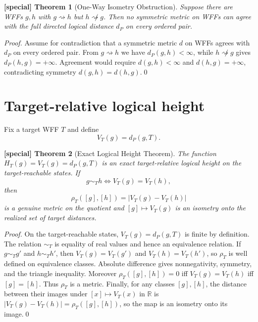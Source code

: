 \documentclass[11pt]{article}
\newtheorem{spthm}{[special] Theorem}
\newcommand{\dP}{d_P}
\begin{document}
\begin{spthm}[One-Way Isometry Obstruction]
Suppose there are WFFs $g,h$ with $g\rightsquigarrow h$ but $h\not\rightsquigarrow g$. Then no symmetric metric on WFFs can agree with the full directed logical distance $\dP$ on every ordered pair.
\end{spthm}
\textit{Proof.} Assume for contradiction that a symmetric metric $d$ on WFFs agrees with $d_P$ on every ordered pair. From $g\rightsquigarrow h$ we have $d_P(g,h)<\infty$, while $h\not\rightsquigarrow g$ gives $d_P(h,g)=+\infty$. Agreement would require $d(g,h)<\infty$ and $d(h,g)=+\infty$, contradicting symmetry $d(g,h)=d(h,g)$.\qed


\section{Target-relative logical height}
Fix a target WFF $T$ and define
\[V_T(g)=\dP(g,T).\]

\begin{spthm}[Exact Logical Height Theorem]
The function $H_T(g)=V_T(g)=\dP(g,T)$ is an exact target-relative logical height on the target-reachable states. If
\[g\sim_T h\iff V_T(g)=V_T(h),\]
then
\[\rho_T([g],[h])=|V_T(g)-V_T(h)|\]
is a genuine metric on the quotient and $[g]\mapsto V_T(g)$ is an isometry onto the realized set of target distances.
\end{spthm}
\textit{Proof.} On the target-reachable states, $V_T(g)=d_P(g,T)$ is finite by definition. The relation $\sim_T$ is equality of real values and hence an equivalence relation. If $g\sim_T g'$ and $h\sim_T h'$, then $V_T(g)=V_T(g')$ and $V_T(h)=V_T(h')$, so $\rho_T$ is well defined on equivalence classes. Absolute difference gives nonnegativity, symmetry, and the triangle inequality. Moreover $\rho_T([g],[h])=0$ iff $V_T(g)=V_T(h)$ iff $[g]=[h]$. Thus $\rho_T$ is a metric. Finally, for any classes $[g],[h]$, the distance between their images under $[x]\mapsto V_T(x)$ in $\mathbb R$ is $|V_T(g)-V_T(h)|=\rho_T([g],[h])$, so the map is an isometry onto its image.\qed
\end{document}
